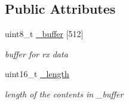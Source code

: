 \subsection*{Public Attributes}
\begin{DoxyCompactItemize}
\item 
uint8\+\_\+t \hyperlink{class_wasp_u_a_r_t_a7a2e8d5e13129a64d6c5c8372229d268}{\+\_\+buffer} \mbox{[}512\mbox{]}\hypertarget{class_wasp_u_a_r_t_a7a2e8d5e13129a64d6c5c8372229d268}{}\label{class_wasp_u_a_r_t_a7a2e8d5e13129a64d6c5c8372229d268}

\begin{DoxyCompactList}\small\item\em buffer for rx data \end{DoxyCompactList}\item 
uint16\+\_\+t \hyperlink{class_wasp_u_a_r_t_aefd2c2f7fa3a814568f16494b947e7ad}{\+\_\+length}\hypertarget{class_wasp_u_a_r_t_aefd2c2f7fa3a814568f16494b947e7ad}{}\label{class_wasp_u_a_r_t_aefd2c2f7fa3a814568f16494b947e7ad}

\begin{DoxyCompactList}\small\item\em length of the contents in \textquotesingle{}\+\_\+buffer\textquotesingle{} \end{DoxyCompactList}\end{DoxyCompactItemize}

